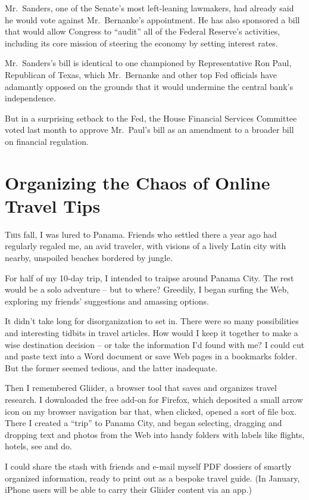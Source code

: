 ﻿\documentclass[12pt]{article}
\begin{document}
Mr.~Sanders, one of the Senate's most left-leaning lawmakers, had already said he would vote against
Mr.~Bernanke's appointment. He has also sponsored a bill that would allow Congress to ``audit'' all
of the Federal Reserve's activities, including its core mission of steering the economy by setting
interest rates.

Mr.~Sanders's bill is identical to one championed by Representative Ron Paul, Republican of Texas,
which Mr.~Bernanke and other top Fed officials have adamantly opposed on the grounds that it would
undermine the central bank's independence.

But in a surprising setback to the Fed, the House Financial Services Committee voted last month to
approve Mr.~Paul's bill as an amendment to a broader bill on financial regulation.

\section{Organizing the Chaos of Online Travel Tips}

\lettrine{T}{his} fall, I was lured to Panama. Friends who settled there a
year ago had regularly regaled me, an avid traveler, with visions of a lively Latin city with
nearby, unspoiled beaches bordered by jungle.

For half of my 10-day trip, I intended to traipse around Panama City. The rest would be a solo
adventure -- but to where? Greedily, I began surfing the Web, exploring my friends' suggestions and
amassing options.

It didn't take long for disorganization to set in. There were so many possibilities and interesting
tidbits in travel articles. How would I keep it together to make a wise destination decision -- or
take the information I'd found with me? I could cut and paste text into a Word document or save Web
pages in a bookmarks folder. But the former seemed tedious, and the latter inadequate.

Then I remembered Gliider, a browser tool that saves and organizes travel research. I downloaded the
free add-on for Firefox, which deposited a small arrow icon on my browser navigation bar that, when
clicked, opened a sort of file box. There I created a ``trip'' to Panama City, and began selecting,
dragging and dropping text and photos from the Web into handy folders with labels like flights,
hotels, see and do.

I could share the stash with friends and e-mail myself PDF dossiers of smartly organized
information, ready to print out as a bespoke travel guide. (In January, iPhone users will be able to
carry their Gliider content via an app.)
\end{document}
